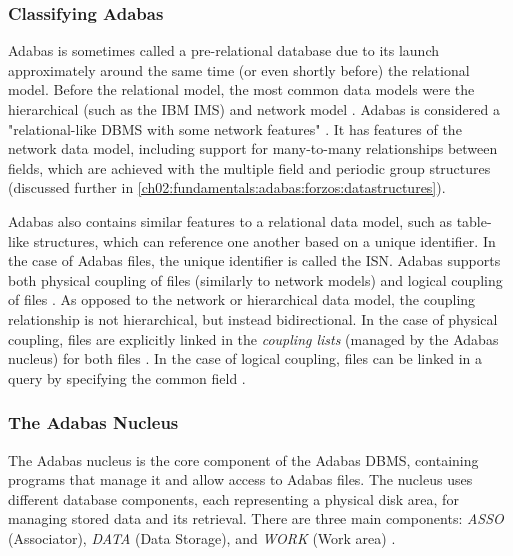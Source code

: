 \subsubsection{Classifying Adabas}
\label{ch02:fundamentals:adabas:forzos:classifying}
Adabas is sometimes called a pre-relational database \cite{ibm_redpaper_key} due to its launch approximately around the same time (or even shortly before) the relational model. Before the relational model, the most common data models were the hierarchical (such as the IBM IMS) and network model \cite{stonebrakerwhatgoesaroundcomesaround}. Adabas is considered a "relational-like \ac{DBMS} with some network features" \cite{adabashybrid}. It has features of the network data model, including support for many-to-many relationships between fields, which are achieved with the multiple field and periodic group structures (discussed further in \ref{ch02:fundamentals:adabas:forzos:datastructures}).

Adabas also contains similar features to a relational data model, such as table-like structures, which can reference one another based on a unique identifier. In the case of Adabas files, the unique identifier is called the \ac{ISN}. Adabas supports both physical coupling of files (similarly to network models) and logical coupling of files \cite{adabasconcepts}. As opposed to the network or hierarchical data model, the coupling relationship is not hierarchical, but instead bidirectional. In the case of physical coupling, files are explicitly linked in the \textit{coupling lists} (managed by the Adabas nucleus) for both files \cite{adabashybrid}. In the case of logical coupling, files can be linked in a query by specifying the common field \cite{adabasconcepts}. %

\subsubsection{The Adabas Nucleus}
The Adabas nucleus is the core component of the Adabas \ac{DBMS}, containing programs that manage it and allow access to Adabas files. The nucleus uses different database components, each representing a physical disk area, for managing stored data and its retrieval. There are three main components: \textit{ASSO} (Associator), \textit{DATA} (Data Storage), and \textit{WORK} (Work area) \cite{adabasconcepts}.

